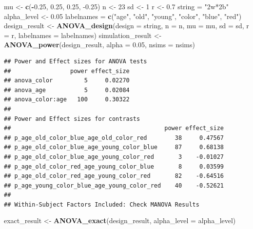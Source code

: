 \documentclass[]{book}
\newenvironment{Shaded}{\begin{snugshade}}{\end{snugshade}}
\newcommand{\DataTypeTok}[1]{\textcolor[rgb]{0.13,0.29,0.53}{#1}}
\newcommand{\DecValTok}[1]{\textcolor[rgb]{0.00,0.00,0.81}{#1}}
\newcommand{\FloatTok}[1]{\textcolor[rgb]{0.00,0.00,0.81}{#1}}
\newcommand{\KeywordTok}[1]{\textcolor[rgb]{0.13,0.29,0.53}{\textbf{#1}}}
\newcommand{\NormalTok}[1]{#1}
\newcommand{\OperatorTok}[1]{\textcolor[rgb]{0.81,0.36,0.00}{\textbf{#1}}}
\newcommand{\StringTok}[1]{\textcolor[rgb]{0.31,0.60,0.02}{#1}}
\begin{document}
\begin{Shaded}
\begin{Highlighting}[]
\NormalTok{mu <-}\StringTok{ }\KeywordTok{c}\NormalTok{(}\OperatorTok{-}\FloatTok{0.25}\NormalTok{, }\FloatTok{0.25}\NormalTok{, }\FloatTok{0.25}\NormalTok{, }\FloatTok{-0.25}\NormalTok{)}
\NormalTok{n <-}\StringTok{ }\DecValTok{23}
\NormalTok{sd <-}\StringTok{ }\DecValTok{1}
\NormalTok{r <-}\StringTok{ }\FloatTok{0.7}
\NormalTok{string =}\StringTok{ "2w*2b"}
\NormalTok{alpha_level <-}\StringTok{ }\FloatTok{0.05}
\NormalTok{labelnames =}\StringTok{ }\KeywordTok{c}\NormalTok{(}\StringTok{"age"}\NormalTok{, }\StringTok{"old"}\NormalTok{, }\StringTok{"young"}\NormalTok{, }\StringTok{"color"}\NormalTok{, }\StringTok{"blue"}\NormalTok{, }\StringTok{"red"}\NormalTok{)}
\NormalTok{design_result <-}\StringTok{ }\KeywordTok{ANOVA_design}\NormalTok{(}\DataTypeTok{design =}\NormalTok{ string,}
                              \DataTypeTok{n =}\NormalTok{ n, }
                              \DataTypeTok{mu =}\NormalTok{ mu, }
                              \DataTypeTok{sd =}\NormalTok{ sd, }
                              \DataTypeTok{r =}\NormalTok{ r, }
                              \DataTypeTok{labelnames =}\NormalTok{ labelnames)}
\NormalTok{simulation_result <-}\StringTok{ }\KeywordTok{ANOVA_power}\NormalTok{(design_result, }\DataTypeTok{alpha =} \FloatTok{0.05}\NormalTok{, }\DataTypeTok{nsims =}\NormalTok{ nsims)}
\end{Highlighting}
\end{Shaded}

\begin{verbatim}
## Power and Effect sizes for ANOVA tests
##                 power effect_size
## anova_color         5     0.02270
## anova_age           5     0.02084
## anova_color:age   100     0.30322
## 
## Power and Effect sizes for contrasts
##                                            power effect_size
## p_age_old_color_blue_age_old_color_red        38     0.47567
## p_age_old_color_blue_age_young_color_blue     87     0.68138
## p_age_old_color_blue_age_young_color_red       3    -0.01027
## p_age_old_color_red_age_young_color_blue       8     0.03599
## p_age_old_color_red_age_young_color_red       82    -0.64516
## p_age_young_color_blue_age_young_color_red    40    -0.52621
## 
## Within-Subject Factors Included: Check MANOVA Results
\end{verbatim}

\begin{Shaded}
\begin{Highlighting}[]
\NormalTok{exact_result <-}\StringTok{ }\KeywordTok{ANOVA_exact}\NormalTok{(design_result, }\DataTypeTok{alpha_level =}\NormalTok{ alpha_level)}
\end{Highlighting}
\end{Shaded}
\end{document}
